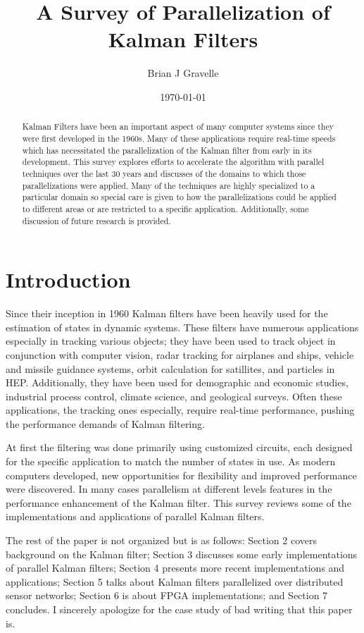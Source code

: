 \documentclass[11pt]{article}
\title{A Survey of Parallelization of Kalman Filters}
\author{
       Brian J Gravelle 
}
\date{\today}
\begin{document}
\maketitle

\begin{abstract}
Kalman Filters have been an important aspect of many computer systems since they were first developed in the 1960s. Many of these applications require real-time speeds which has necessitated the parallelization of the Kalman filter from early in its development. This survey explores efforts to accelerate the algorithm with parallel techniques over the last 30 years  and discusses of the domains to which those parallelizations were applied. Many of the techniques are highly specialized to a particular domain so special care is given to how the parallelizations could be applied to different areas or are restricted to a specific application. Additionally, some discussion of future research is provided.
\end{abstract}

\section{Introduction}
Since their inception in 1960 Kalman filters have been heavily used for the estimation of states in dynamic systems. These filters have numerous applications especially in tracking various objects; they have been used to track object in conjunction with computer vision, radar tracking for airplanes and ships, vehicle and missile guidance systems, orbit calculation for satillites, and particles in HEP. Additionally, they have been used for demographic and economic studies, industrial process control, climate science, and geological surveys. Often these applications, the tracking ones especially, require real-time performance, pushing the performance demands of Kalman filtering.

At first the filtering was done primarily using customized circuits, each designed for the specific application to match the number of states in use. As modern computers developed, new opportunities for flexibility and improved performance were discovered. In many cases parallelism at different levels features in the performance enhancement of the Kalman filter. This survey reviews some of the implementations and applications of parallel Kalman filters.

The rest of the paper is not organized but is as follows: Section 2 covers background on the Kalman filter; Section 3 discusses some early implementations of parallel Kalman filters; Section 4 presents more recent implementations and applications; Section 5 talks about Kalman filters parallelized over distributed sensor networks; Section 6 is about FPGA implementations; and Section 7 concludes. I sincerely apologize for the case study of bad writing that this paper is.
\end{document}
